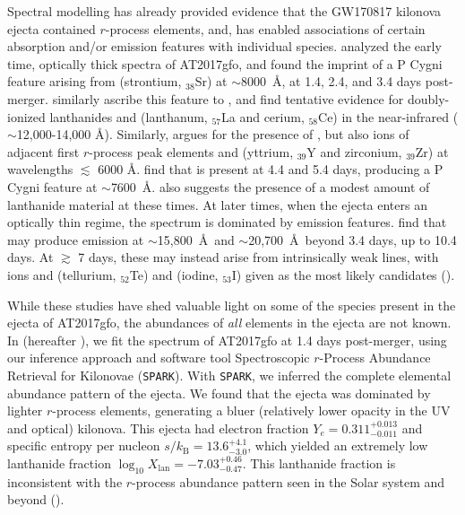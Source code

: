 \documentclass[twocolumn,twocolappendix]{aastex63}
\def\SPARK{\texttt{SPARK}}
\def\V23{\citetalias{vieira23}}
\begin{document}
Spectral modelling has already provided evidence that the GW170817 kilonova ejecta contained $r$-process elements, and, has enabled associations of certain absorption and/or emission features with individual species. \cite{watson19} analyzed the early time, optically thick spectra of AT2017gfo, and found the imprint of a P Cygni feature arising from  (strontium, ${}_{38}$Sr) at $\sim$8000~\AA, at 1.4, 2.4, and 3.4 days post-merger. \cite{domoto21, domoto22} similarly ascribe this feature to , and find tentative evidence for doubly-ionized lanthanides  and  (lanthanum, ${}_{57}$La and cerium, ${}_{58}$Ce) in the near-infrared ($\sim$12,000-14,000 \AA). Similarly, \cite{gillanders22} argues for the presence of , but also ions of adjacent first $r$-process peak elements  and  (yttrium, ${}_{39}$Y and zirconium, ${}_{39}$Zr) at wavelengths $\lesssim$ 6000 \AA. \cite{sneppenwatson23} find that  is present at 4.4 and 5.4 days, producing a P Cygni feature at $\sim$7600~\AA. \cite{gillanders22} also suggests the presence of a modest amount of lanthanide material at these times.  At later times, when the ejecta enters an optically thin regime, the spectrum is dominated by emission features. \cite{gillanders23} find that  may produce emission at $\sim$15,800~\AA~and $\sim$20,700~\AA~beyond 3.4 days, up to 10.4 days. At $\gtrsim$ 7 days, these may instead arise from intrinsically weak lines, with ions  and  (tellurium, ${}_{52}$Te) and  (iodine, ${}_{53}$I) given as the most likely candidates (\citealt{gillanders23, hotokezaka23}). 

While these studies have shed valuable light on some of the species present in the ejecta of AT2017gfo, the abundances of \textit{all} elements in the ejecta are not known. In \cite{vieira23} (hereafter \V23), we fit the spectrum of AT2017gfo at 1.4 days post-merger, using our inference approach and software tool Spectroscopic $r$-Process Abundance Retrieval for Kilonovae (\SPARK). With \SPARK, we inferred the complete elemental abundance pattern of the ejecta. We found that the ejecta was dominated by lighter $r$-process elements, generating a bluer (relatively lower opacity in the UV and optical) kilonova. This ejecta had electron fraction $Y_e = 0.311^{+0.013}_{-0.011}$ and specific entropy per nucleon $s / k_{\mathrm{B}} = 13.6^{+4.1}_{-3.0}$, which yielded an extremely low lanthanide fraction $\log_{10} X_{\mathrm{lan}} = {-7.03}^{+0.46}_{-0.47}$. This lanthanide fraction is inconsistent with the $r$-process abundance pattern seen in the Solar system and beyond (\citealt{ji19}). 
\end{document}
